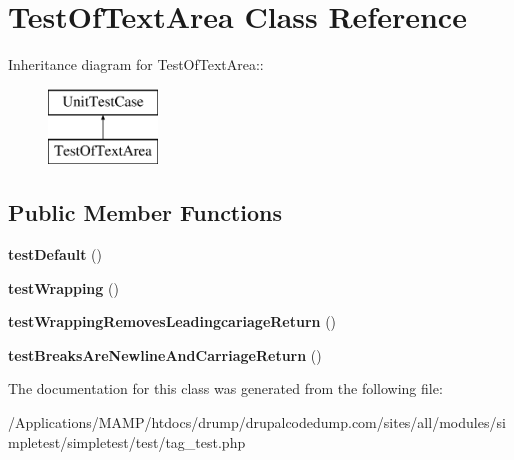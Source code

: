 \hypertarget{class_test_of_text_area}{
\section{TestOfTextArea Class Reference}
\label{class_test_of_text_area}
}
Inheritance diagram for TestOfTextArea::\begin{figure}[H]
\begin{center}
\leavevmode
\includegraphics[height=2cm]{class_test_of_text_area}
\end{center}
\end{figure}
\subsection*{Public Member Functions}
\begin{DoxyCompactItemize}
\item 
\hypertarget{class_test_of_text_area_a8b7e4c99f0384a85c932cd098de90c16}{
{\bfseries testDefault} ()}
\label{class_test_of_text_area_a8b7e4c99f0384a85c932cd098de90c16}

\item 
\hypertarget{class_test_of_text_area_a32e42358d402af1dec20839e7db32a6d}{
{\bfseries testWrapping} ()}
\label{class_test_of_text_area_a32e42358d402af1dec20839e7db32a6d}

\item 
\hypertarget{class_test_of_text_area_ae89185bdebbaaf20919579a2f11c6096}{
{\bfseries testWrappingRemovesLeadingcariageReturn} ()}
\label{class_test_of_text_area_ae89185bdebbaaf20919579a2f11c6096}

\item 
\hypertarget{class_test_of_text_area_a1b5992f4017cbda46b7fcbf81db5967d}{
{\bfseries testBreaksAreNewlineAndCarriageReturn} ()}
\label{class_test_of_text_area_a1b5992f4017cbda46b7fcbf81db5967d}

\end{DoxyCompactItemize}


The documentation for this class was generated from the following file:\begin{DoxyCompactItemize}
\item 
/Applications/MAMP/htdocs/drump/drupalcodedump.com/sites/all/modules/simpletest/simpletest/test/tag\_\-test.php\end{DoxyCompactItemize}
